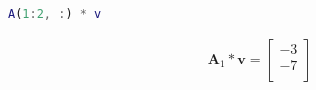 \begin{lstlisting}[language=Matlab]
A(1:2, :) * v
\end{lstlisting}

\begin{solution}
\begin{align*}
    \boldsymbol{A}_1 * \boldsymbol{v} = \begin{bmatrix}
    -3 \\ -7 \\
    \end{bmatrix}
\end{align*}
\end{solution}